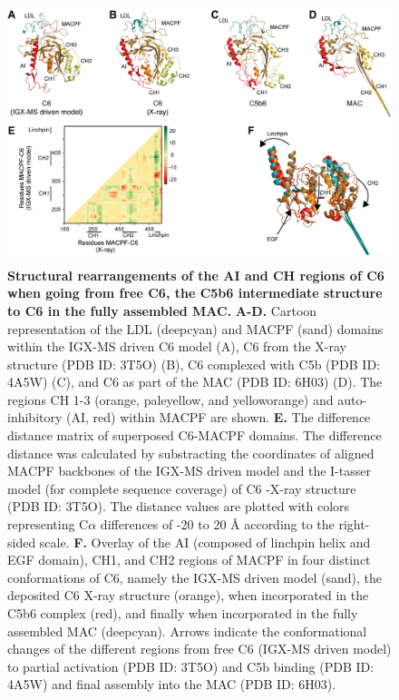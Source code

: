 \begin{subappendices}
\begin{figure}[hbt]
		\label{fig:ch2_app_fig6}
	\end{figure}
	\begin{figure}[hbt]
		\center
		\includegraphics[]{Chapter.2/Figures/EV_Figure2.png}
		\caption{\textbf{Structural rearrangements of the AI and CH regions of C6 when going from free C6, the C5b6 intermediate structure to C6 in the fully assembled MAC.} \textbf{A-D.} Cartoon representation of the LDL (deepcyan) and MACPF (sand) domains within the IGX-MS driven C6 model (A), C6 from the X-ray structure (PDB ID: 3T5O) (B), C6 complexed with C5b (PDB ID: 4A5W) (C), and C6 as part of the MAC (PDB ID: 6H03) (D). The regions CH 1-3 (orange, paleyellow, and yelloworange) and auto-inhibitory (AI, red) within MACPF are shown. \textbf{E.} The difference distance matrix of superposed C6-MACPF domains. The difference distance was calculated by substracting the coordinates of aligned MACPF backbones of the IGX-MS driven model and the I-tasser model (for complete sequence coverage) of C6 -X-ray structure (PDB ID: 3T5O). The distance values are plotted with colors representing C$\alpha$ differences of -20 to 20 Å according to the right-sided scale. \textbf{F.} Overlay of the AI (composed of linchpin helix and EGF domain), CH1, and CH2 regions of MACPF in four distinct conformations of C6, namely the IGX-MS driven model (sand), the deposited C6 X-ray structure (orange), when incorporated in the C5b6 complex (red), and finally when incorporated in the fully assembled MAC (deepcyan). Arrows indicate the conformational changes of the different regions from free C6 (IGX-MS driven model) to partial activation (PDB ID: 3T5O) and C5b binding (PDB ID: 4A5W) and final assembly into the MAC (PDB ID: 6H03).}
		\label{fig:ch2_app_fig7}
	\end{figure}

\end{subappendices}
